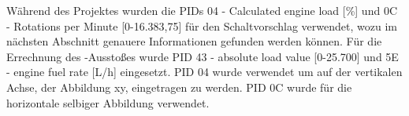 Während des Projektes wurden die PIDs 04 - Calculated engine load [\%] und 0C - Rotations per Minute [0-16.383,75] für den Schaltvorschlag verwendet, wozu im nächsten Abschnitt genauere Informationen gefunden werden können. Für die Errechnung des -Ausstoßes wurde PID 43 - absolute load value [0-25.700] und 5E - engine fuel rate [L/h] eingesetzt.
PID 04 wurde verwendet um auf der vertikalen Achse, der Abbildung xy, eingetragen zu werden. PID 0C wurde für die horizontale selbiger Abbildung verwendet.

\clearpage %